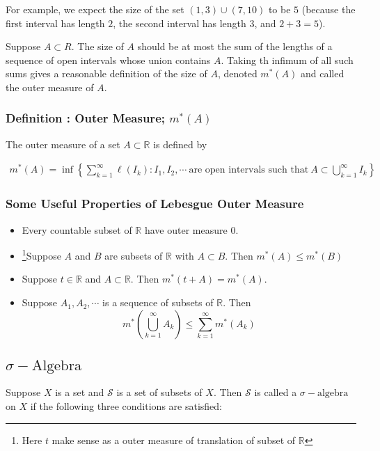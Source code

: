 \documentclass[12pt, a4paper]{article} %
\begin{document}
            For example, we expect the size of the set $\left(1,3\right) \cup \left(7, 10\right)$ to be $5$ (because the first interval has length $2$, the second interval has length $3$, and $2 + 3 = 5$).



            Suppose $A \subset R$. The size of $A$ should be at most the sum of the lengths of a sequence of open intervals whose union contains $A$. Taking th infimum of all such sums gives a reasonable definition of the size of $A$, denoted $m^*(A)$ and called the outer measure of $A$.


            \subsubsection{Definition : Outer Measure; $m^*(A)$}
                The outer measure of a set $A\subset \mathbb{R}$ is defined by

                \begin{align*}
                    \boxed{m^*(A) = \inf\left\{\sum_{k=1}^{\infty} \ell\left(I_k\right) : I_1, I_2, \cdots\ \mbox{are open intervals such that}\ A\subset \bigcup_{k=1}^{\infty} I_k\right\}}
                \end{align*}

        \newpage

        \subsubsection{Some Useful Properties of Lebesgue Outer Measure} 
            \begin{itemize}
                \item Every countable subset of $\mathbb{R}$ have outer measure $0$.
                \item \footnote{Here $t$ make sense as a outer measure of translation of subset of $\mathbb{R}$}Suppose $A$ and $B$ are subsets of $\mathbb{R}$ with $A \subset B$. Then $m^*(A) \leq m^*(B)$
                \item Suppose $t \in \mathbb{R}$ and $A \subset \mathbb{R}$. Then $m^*(t + A) = m^*(A)$.
                \item Suppose $A_1, A_2, \cdots$ is a sequence of subsets of $\mathbb{R}$. Then
                \[m^*\left(\bigcup_{k=1}^{\infty} A_k\right) \leq \sum_{k=1}^{\infty}m^*(A_k)\]
            \end{itemize}

        \subsection{$\sigma-\mbox{Algebra}$}   
            Suppose $X$ is a set and $\mathcal{S}$ is a set of subsets of $X$. Then $\mathcal{S}$ is called a $\sigma-\mbox{algebra}$ on $X$ if the following three conditions are satisfied:
\end{document}
